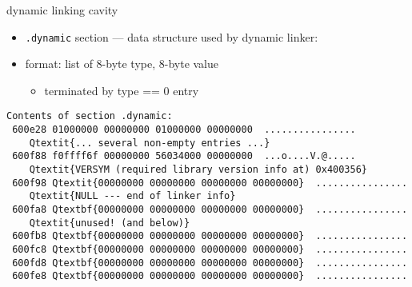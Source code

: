 \begin{frame}[label=spaceDyn,fragile]{dynamic linking cavity}
\begin{itemize}
\item {\tt .dynamic} section --- data structure used by dynamic linker:
\item format: list of 8-byte type, 8-byte value
    \begin{itemize}
    \item terminated by type == 0 entry
    \end{itemize}
\end{itemize}
\begin{Verbatim}[fontsize=\fontsize{9}{10}\selectfont,commandchars=Q\{\}]
Contents of section .dynamic:
 600e28 01000000 00000000 01000000 00000000  ................
    Qtextit{... several non-empty entries ...}
 600f88 f0ffff6f 00000000 56034000 00000000  ...o....V.@.....
    Qtextit{VERSYM (required library version info at) 0x400356}
 600f98 Qtextit{00000000 00000000 00000000 00000000}  ................
    Qtextit{NULL --- end of linker info}
 600fa8 Qtextbf{00000000 00000000 00000000 00000000}  ................
    Qtextit{unused! (and below)}
 600fb8 Qtextbf{00000000 00000000 00000000 00000000}  ................
 600fc8 Qtextbf{00000000 00000000 00000000 00000000}  ................
 600fd8 Qtextbf{00000000 00000000 00000000 00000000}  ................
 600fe8 Qtextbf{00000000 00000000 00000000 00000000}  ................
\end{Verbatim}
\end{frame}



